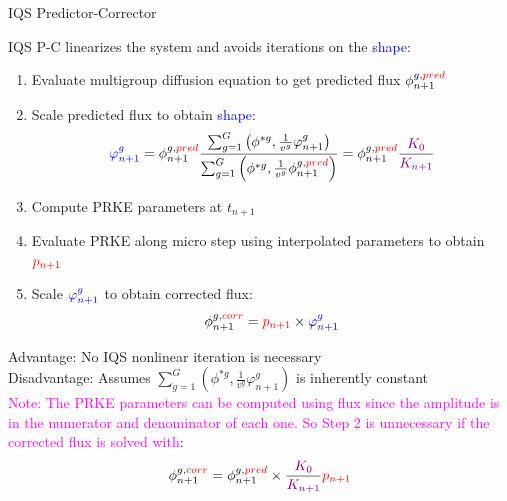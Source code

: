 \documentclass[8pt]{beamer}
\newcommand{\ben}{\begin{enumerate}}
\newcommand{\een}{\end{enumerate}}
\newcommand{\tcr}[1]{\textcolor{red}{#1}}
\newcommand{\tcb}[1]{\textcolor{blue}{#1}}
\newcommand{\tcm}[1]{\textcolor{magenta}{#1}}
\newcommand{\tcp}[1]{\textcolor{violet}{#1}}
\begin{document}
\begin{frame}{IQS Predictor-Corrector}

IQS P-C linearizes the system and avoids iterations on the \tcb{shape}: 
\ben
\item Evaluate multigroup diffusion equation to get predicted flux $\phi_{n+1}^{g,\tcr{pred}}$
\item Scale predicted flux to obtain \tcb{shape}:
\[
\tcb{\varphi^{g}_{n+1}} = \phi_{n+1}^{g,\tcr{pred}} \frac{\sum_{g=1}^G\left(\phi^{*g},\frac{1}{v^g}\varphi^g_{n+1}\right)}{\sum_{g=1}^G \left(\phi^{*g},\frac{1}{v^g}\phi_{n+1}^{g,\tcr{pred}}\right)} = \phi_{n+1}^{g,\tcr{pred}} \frac{\tcp{K_0}}{\tcp{K_{n+1}}}
\]
\item Compute PRKE parameters at $t_{n+1}$
\item Evaluate PRKE along micro step using interpolated parameters to obtain $\tcr{p_{n+1}}$
\item Scale $\tcb{\varphi^{g}_{n+1}}$ to obtain corrected flux:
\[
\phi_{n+1}^{g,\tcr{corr}} = \tcr{p_{n+1}} \times \tcb{\varphi^{g}_{n+1}}
\]
\een

 Advantage: No IQS nonlinear iteration is necessary \\
 Disadvantage: Assumes $\sum_{g=1}^G\left(\phi^{*g},\frac{1}{v^g}\varphi^g_{n+1}\right)$ is inherently constant \\
\vspace{2mm}
\small \tcm{Note: The PRKE parameters can be computed using flux since the amplitude is in the numerator and denominator of each one. So Step 2 is unnecessary if the corrected flux is solved with}:
\[
\phi_{n+1}^{g,\tcr{corr}} = \phi_{n+1}^{g,\tcr{pred}} \times \frac{\tcp{K_0}}{\tcp{K_{n+1}}} \tcr{p_{n+1}}
\]
\normalsize

\end{frame}
\end{document}
